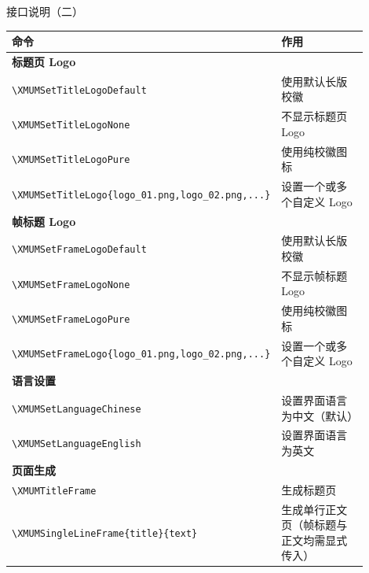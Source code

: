 \documentclass[aspectratio=169,11pt]{ctexbeamer}
\begin{document}
\begin{frame}{接口说明（二）}
    \begin{table}
        \centering
        \tiny
        \begin{tabular}{p{0.45\linewidth}p{0.45\linewidth}}
            \toprule
            命令 & 作用 \\
            \midrule
            \multicolumn{2}{l}{\textbf{标题页 Logo}} \\
            \texttt{\textbackslash XMUMSetTitleLogoDefault} & 使用默认长版校徽 \\
            \texttt{\textbackslash XMUMSetTitleLogoNone} & 不显示标题页 Logo \\
            \texttt{\textbackslash XMUMSetTitleLogoPure} & 使用纯校徽图标 \\
            \texttt{\textbackslash XMUMSetTitleLogo\{logo\_01.png,logo\_02.png,...\}} & 设置一个或多个自定义 Logo \\
            \midrule
            \multicolumn{2}{l}{\textbf{帧标题 Logo}} \\
            \texttt{\textbackslash XMUMSetFrameLogoDefault} & 使用默认长版校徽 \\
            \texttt{\textbackslash XMUMSetFrameLogoNone} & 不显示帧标题 Logo \\
            \texttt{\textbackslash XMUMSetFrameLogoPure} & 使用纯校徽图标 \\
            \texttt{\textbackslash XMUMSetFrameLogo\{logo\_01.png,logo\_02.png,...\}} & 设置一个或多个自定义 Logo \\
            \midrule
            \multicolumn{2}{l}{\textbf{语言设置}} \\
            \texttt{\textbackslash XMUMSetLanguageChinese} & 设置界面语言为中文（默认） \\
            \texttt{\textbackslash XMUMSetLanguageEnglish} & 设置界面语言为英文 \\
            \midrule
            \multicolumn{2}{l}{\textbf{页面生成}} \\
            \texttt{\textbackslash XMUMTitleFrame} & 生成标题页 \\
            \texttt{\textbackslash XMUMSingleLineFrame\{title\}\{text\}} & 生成单行正文页（帧标题与正文均需显式传入） \\
            \bottomrule
        \end{tabular}
    \end{table}
\end{frame}
\end{document}
